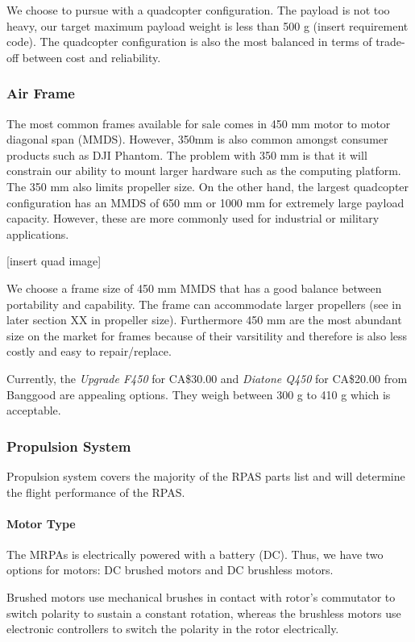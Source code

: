 We choose to pursue with a quadcopter configuration. The payload is not too heavy, our target maximum payload weight is less than 500 g (insert requirement code). The quadcopter configuration is also the most balanced in terms of trade-off between cost and reliability. 

\subsubsection{Air Frame}

The most common frames available for sale comes in 450 mm motor to motor diagonal span (MMDS). However, 
350mm is also common amongst consumer products such as DJI Phantom. The problem with 350 mm is that it will 
constrain our ability to mount larger hardware such as the computing platform. The 350 mm also limits 
propeller size. On the other hand, the largest quadcopter configuration has an MMDS of 650 mm or 1000 mm 
for extremely large payload capacity. However, these are more commonly used for industrial or military 
applications.

[insert quad image]

We choose a frame size of 450 mm MMDS that has a good balance between portability and capability. The frame 
can accommodate larger propellers (see in later section XX in propeller size). Furthermore 450 mm are the 
most abundant size on the market for frames because of their varsitility and therefore is also less costly 
and easy to repair/replace.

Currently, the \textit{Upgrade F450} for CA\$30.00 and \textit{Diatone Q450} for CA\$20.00 from Banggood are appealing options. They weigh between 300 g to 410 g which is acceptable.

\subsubsection{Propulsion System}

Propulsion system covers the majority of the RPAS parts list and will determine the flight performance of the RPAS. 

\paragraph{Motor Type}

The MRPAs is electrically powered with a battery (DC). Thus, we have two options for motors: DC brushed 
motors and DC brushless motors.

Brushed motors use mechanical brushes in contact with rotor’s commutator to switch polarity to sustain a 
constant rotation, whereas the brushless motors use electronic controllers to switch the polarity in the 
rotor electrically. 

